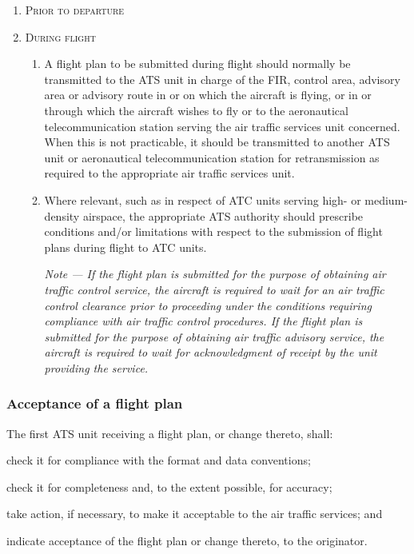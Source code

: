\documentclass[../main.tex]{subfiles}
\begin{document}
    \begin{enumerate}[itemsep=0.2cm]\centering
        \item \textsc{Prior to departure}

        \item \textsc{During flight}
        \begin{enumerate}
            \item A flight plan to be submitted during flight should normally be transmitted to the ATS unit in charge of the FIR, control area, advisory area or advisory route in or on which the aircraft is flying, or in or through which the aircraft wishes to fly or to the aeronautical telecommunication station serving the air traffic services unit concerned. When this is not practicable, it should be transmitted to another ATS unit or aeronautical telecommunication station for retransmission as required to the appropriate air traffic services unit.
            \item Where relevant, such as in respect of ATC units serving high- or medium-density airspace, the appropriate ATS authority should prescribe conditions and/or limitations with respect to the submission of flight plans during flight to ATC units.

            \textit{Note --- If the flight plan is submitted for the purpose of obtaining air traffic control service, the aircraft is required to wait for an air traffic control clearance prior to proceeding under the conditions requiring compliance with air traffic control procedures. If the flight plan is submitted for the purpose of obtaining air traffic advisory service, the aircraft is required to wait for acknowledgment of receipt by the unit providing the service.}
        \end{enumerate}
    \end{enumerate}

    \subsubsection{Acceptance of a flight plan}

    The first ATS unit receiving a flight plan, or change thereto, shall:

    \begin{enumalph}
        \item check it for compliance with the format and data conventions;
        \item check it for completeness and, to the extent possible, for accuracy;
        \item take action, if necessary, to make it acceptable to the air traffic services; and
        \item indicate acceptance of the flight plan or change thereto, to the originator.
    \end{enumalph}
\end{document}
